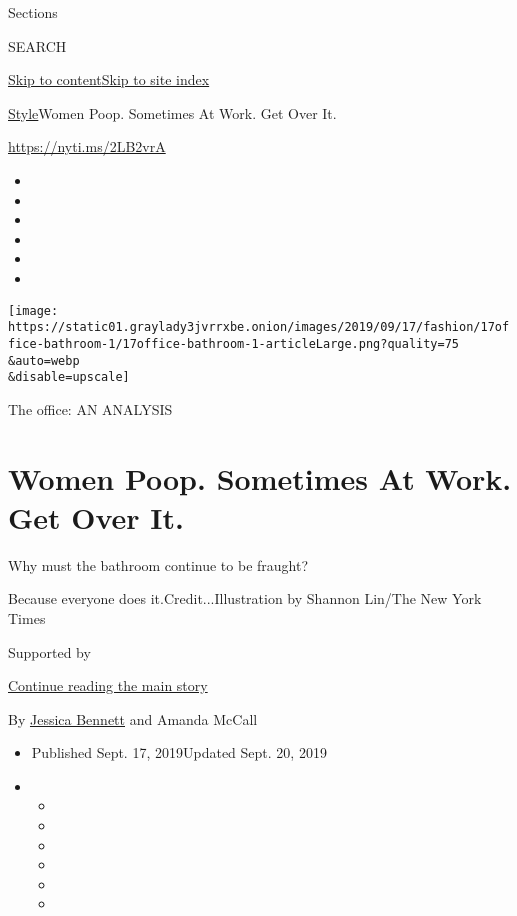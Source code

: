 Sections

SEARCH

\protect\hyperlink{site-content}{Skip to
content}\protect\hyperlink{site-index}{Skip to site index}

\href{/section/style}{Style}\textbar{}Women Poop. Sometimes At Work. Get
Over It.

\href{https://nyti.ms/2LB2vrA}{https://nyti.ms/2LB2vrA}

\begin{itemize}
\item
\item
\item
\item
\item
\item
\end{itemize}

\texttt{[image: https://static01.graylady3jvrrxbe.onion/images/2019/09/17/fashion/17office-bathroom-1/17office-bathroom-1-articleLarge.png?quality=75\\\&auto=webp\\\&disable=upscale]}

The office: AN ANALYSIS

\hypertarget{women-poop-sometimes-at-work-get-over-it}{%
\section{Women Poop. Sometimes At Work. Get Over
It.}\label{women-poop-sometimes-at-work-get-over-it}}

Why must the bathroom continue to be fraught?

Because everyone does it.Credit...Illustration by Shannon Lin/The New
York Times

Supported by

\protect\hyperlink{after-sponsor}{Continue reading the main story}

By \href{https://www.nytimes3xbfgragh.onion/by/jessica-bennett}{Jessica
Bennett} and Amanda McCall

\begin{itemize}
\item
  Published Sept. 17, 2019Updated Sept. 20, 2019
\item
  \begin{itemize}
  \item
  \item
  \item
  \item
  \item
  \item
  \end{itemize}
\end{itemize}


